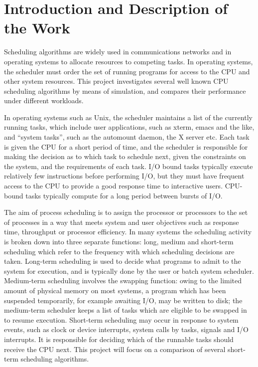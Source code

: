 \documentclass[12pt]{article}
\begin{document}
\section*{Introduction and Description of the Work}

Scheduling algorithms are widely used in communications networks and
in operating systems to allocate resources to competing tasks.  In
operating systems, the scheduler must order the set of running
programs for access to the CPU and other system resources.  This
project investigates several well known CPU scheduling algorithms by
means of simulation, and compares their performance under different
workloads.

In operating systems such as Unix, the scheduler maintains a list of
the currently running tasks, which include user applications, such as
xterm, emacs and the like, and ``system tasks'', such as the automount
daemon, the X server etc.  Each task is given the CPU for a short
period of time, and the scheduler is responsible for making the
decision as to which task to schedule next, given the constraints on
the system, and the requirements of each task.  I/O bound tasks
typically execute relatively few instructions before performing I/O,
but they must have frequent access to the CPU to provide a good
response time to interactive users.  CPU-bound tasks typically compute
for a long period between bursts of I/O.

The aim of process scheduling is to assign the processor or processors
to the set of processes in a way that meets system and user objectives
such as response time, throughput or processor efficiency.  In many
systems the scheduling activity is broken down into three separate
functions: long, medium and short-term scheduling which refer to the
frequency with which scheduling decisions are taken.  Long-term
scheduling is used to decide what programs to admit to the system for
execution, and is typically done by the user or batch system
scheduler.  Medium-term scheduling involves the swapping function:
owing to the limited amount of physical memory on most systems, a
program which has been suspended temporarily, for example awaiting
I/O, may be written to disk; the medium-term scheduler keeps a list of
tasks which are eligible to be swapped in to resume execution.
Short-term scheduling may occur in response to system events, such as
clock or device interrupts, system calls by tasks, signals and I/O
interrupts.  It is responsible for deciding which of the runnable
tasks should receive the CPU next.  This project will focus on a
comparison of several short-term scheduling algorithms.
\end{document}
